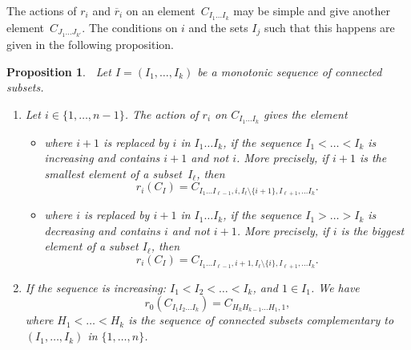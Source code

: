 \documentclass[10pt,a4paper]{amsart}
\numberwithin{equation}{section}
\newtheorem{prop}[theo]{Proposition}
\theoremstyle{definition}
\newcommand{\rb}{\overline{r}}
\begin{document}
The actions of $r_i$ and $\rb_i$ on an element~$C_{I_1\dots I_k}$ may be simple and give another element~$C_{J_1\dots J_{k'}}$. The conditions on $i$ and the sets $I_j$ such that
this happens are given in the following proposition.
\begin{prop}\label{prop-act-ri}$\ $
Let $I=(I_1,\dots,I_k)$ be a monotonic sequence of connected subsets.
\begin{enumerate}\itemsep=0pt
\item[$1.$] Let $i\in\{1,\dots,n-1\}$. The action of $r_i$ on $C_{I_1\dots I_k}$ gives the element
\begin{itemize}\itemsep=0pt
\item where $i+1$ is replaced by $i$ in $I_1\dots I_k$, if the sequence $I_1<\dots<I_k$ is increasing and contains {$i+1$} and not $i$.
More precisely, if $i+1$ is the smallest element of a subset~$I_\ell$, then
\begin{equation*}
 r_i(C_I)= C_{I_1\dots I_{\ell-1}, i, I_{\ell}\setminus \{i+1\}, I_{\ell+1},\dots I_k}.
\end{equation*}

\item where $i$ is replaced by $i+1$ in $I_1\dots I_k$, if the sequence $I_1>\dots>I_k$ is decreasing and contains {$i$} and not $i+1$.
More precisely, if $i$ is the biggest element of a subset $I_\ell$, then
\begin{equation*}
 r_i(C_I)= C_{I_1\dots I_{\ell-1}, i+1, I_{\ell}\setminus \{i\}, I_{\ell+1},\dots I_k}.
\end{equation*}
\end{itemize}
\item[$2.$] If the sequence is increasing: $I_1 < I_2 <\dots< I_k$, and $1\in I_1$. We have
\begin{equation*}
 r_0( C_{I_1I_2\dots I_k} ) = C_{H_k H_{k-1}\dots H_1, 1},
\end{equation*}
where $H_1<\dots < H_k$ is the sequence of connected subsets complementary to $(I_1,\dots,I_k)$ in $\{1,\dots,n\}$.
\end{enumerate}
\end{prop}
\end{document}
